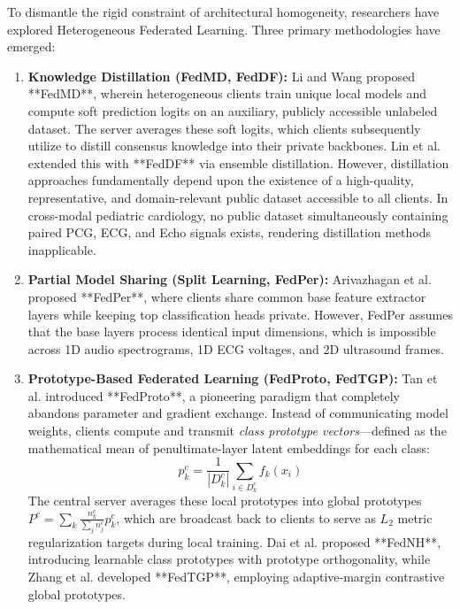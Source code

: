 \documentclass[12pt,a4paper]{amritareport}
\begin{document}
To dismantle the rigid constraint of architectural homogeneity, researchers have explored Heterogeneous Federated Learning. Three primary methodologies have emerged:
\begin{enumerate}
	\item \textbf{Knowledge Distillation (FedMD, FedDF):} Li and Wang \cite{li2019fedmd} proposed **FedMD**, wherein heterogeneous clients train unique local models and compute soft prediction logits on an auxiliary, publicly accessible unlabeled dataset. The server averages these soft logits, which clients subsequently utilize to distill consensus knowledge into their private backbones. Lin et al. \cite{lin2020ensemble} extended this with **FedDF** via ensemble distillation. However, distillation approaches fundamentally depend upon the existence of a high-quality, representative, and domain-relevant public dataset accessible to all clients. In cross-modal pediatric cardiology, no public dataset simultaneously containing paired PCG, ECG, and Echo signals exists, rendering distillation methods inapplicable.
	\item \textbf{Partial Model Sharing (Split Learning, FedPer):} Arivazhagan et al. \cite{arivazhagan2019federated} proposed **FedPer**, where clients share common base feature extractor layers while keeping top classification heads private. However, FedPer assumes that the base layers process identical input dimensions, which is impossible across 1D audio spectrograms, 1D ECG voltages, and 2D ultrasound frames.
	\item \textbf{Prototype-Based Federated Learning (FedProto, FedTGP):} Tan et al. \cite{tan2022fedproto} introduced **FedProto**, a pioneering paradigm that completely abandons parameter and gradient exchange. Instead of communicating model weights, clients compute and transmit \textit{class prototype vectors}—defined as the mathematical mean of penultimate-layer latent embeddings for each class:
	\begin{equation}
		p_k^c = \frac{1}{|D_k^c|} \sum_{i \in D_k^c} f_k(x_i)
	\end{equation}
	The central server averages these local prototypes into global prototypes $P^c = \sum_k \frac{n_k^c}{\sum_j n_j^c} p_k^c$, which are broadcast back to clients to serve as $L_2$ metric regularization targets during local training. Dai et al. \cite{dai2023tackling} proposed **FedNH**, introducing learnable class prototypes with prototype orthogonality, while Zhang et al. \cite{zhang2024fedtgp} developed **FedTGP**, employing adaptive-margin contrastive global prototypes.
\end{enumerate}
\end{document}
